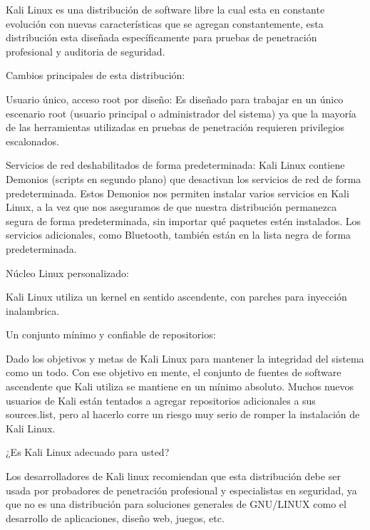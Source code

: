 
Kali Linux es una distribución de software libre la cual esta en constante evolución con nuevas características que se agregan constantemente, esta distribución esta diseñada específicamente para pruebas de penetración profesional y auditoria de seguridad.

Cambios principales de esta distribución:

Usuario único, acceso root por diseño: Es diseñado para trabajar en un único escenario root (usuario principal o administrador del sistema) ya que la mayoría de las herramientas utilizadas en pruebas de penetración requieren privilegios escalonados.

Servicios de red deshabilitados de forma predeterminada: Kali Linux contiene Demonios (scripts en segundo plano) que desactivan los servicios de red de forma predeterminada. Estos Demonios nos permiten instalar varios servicios en Kali Linux, a la vez que nos aseguramos de que nuestra distribución permanezca segura de forma predeterminada, sin importar qué paquetes estén instalados. Los servicios adicionales, como Bluetooth, también están en la lista negra de forma predeterminada.

Núcleo Linux personalizado:

Kali Linux utiliza un kernel en sentido ascendente, con parches para inyección inalambrica.

Un conjunto mínimo y confiable de repositorios:

Dado los objetivos y metas de Kali Linux para mantener la integridad del sistema como un todo. Con ese objetivo en mente, el conjunto de fuentes de software ascendente que Kali utiliza se mantiene en un mínimo absoluto. Muchos nuevos usuarios de Kali están tentados a agregar repositorios adicionales a sus sources.list, pero al hacerlo corre un riesgo muy serio de romper la instalación de Kali Linux.

¿Es Kali Linux adecuado para usted?

Los desarrolladores de Kali linux recomiendan que esta distribución debe ser usada por probadores de penetración profesional y especialistas en seguridad, ya que no es una distribución para soluciones generales de GNU/LINUX como el desarrollo de aplicaciones, diseño web, juegos, etc.

